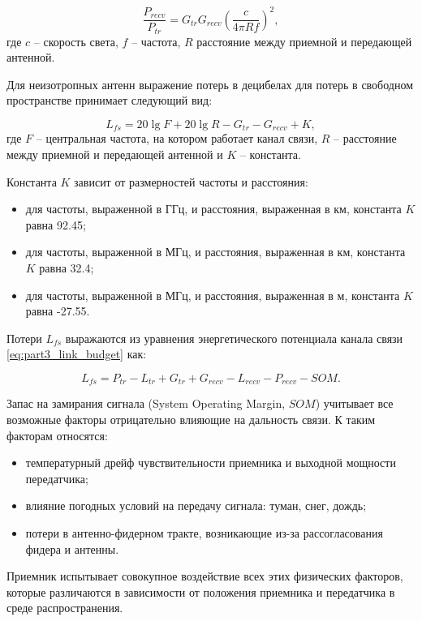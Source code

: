 \begin{equation}
  \label{eq:part1_Friis}
  \frac{P_{recv}}{P_{tr}} = G_{tr}G_{recv}\left(\frac{c}{4\pi R f} \right)^2,
\end{equation}
где
$c$ --  скорость света,
$f$ -- частота, 
$R$ расстояние между приемной и передающей антенной.

Для неизотропных антенн выражение потерь в децибелах для потерь в свободном пространстве принимает следующий вид:

\begin{equation}
  \label{eq:part3_L_fs}
  L_{fs} = 20 \lg{F} + 20\lg{R} - G_{tr} - G_{recv} + K,
  \end{equation}
где $F$ -- центральная частота, на котором работает канал связи, $R$ -- расстояние между приемной и передающей антенной и $K$ -- константа.

Константа $K$ зависит от размерностей частоты и расстояния:

\begin{itemize}
  \item для частоты, выраженной в ГГц, и расстояния, выраженная в км, константа $K$ равна 92.45;
  \item для частоты, выраженной в МГц, и расстояния, выраженная в км, константа $K$ равна 32.4;
  \item для частоты, выраженной в МГц, и расстояния, выраженная в м, константа $K$ равна -27.55.
\end{itemize} 

Потери $L_{fs}$ выражаются из уравнения энергетического потенциала канала связи \cref{eq:part3_link_budget} как:

\begin{equation}
  \label{eq:part3_L_fs_from_link_budget}
  L_{fs} = P_{tr} - L_{tr} + G_{tr} + G_{recv} - L_{recv} - P_{recv} - SOM.
\end{equation}


Запас на замирания сигнала  (System Operating Margin, $SOM$)  учитывает все возможные факторы отрицательно влияющие на дальность связи. К таким факторам относятся:

\begin{itemize}
  \item температурный дрейф чувствительности приемника и выходной мощности передатчика;
  \item влияние погодных условий на передачу сигнала: туман, снег, дождь;
  \item  потери в антенно-фидерном тракте, возникающие из-за рассогласования фидера и антенны.
\end{itemize}
Приемник испытывает совокупное воздействие всех этих физических факторов, которые различаются в зависимости от положения приемника и передатчика в среде распространения. 

